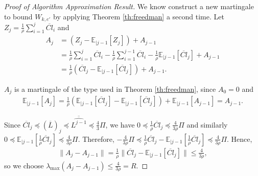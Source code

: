 \documentclass[11pt]{article}
\newcommand{\CExp}[1]{\mathbb{E}_{|#1}}
\begin{document}
\begin{proof}[Proof of Algorithm Approximation Result]
We know construct a new martingale to bound $ W_{k,e'} $ by applying Theorem \ref{th:freedman} a second time. Let $ Z_{j} = \frac{1}{\rho}\sum_{i=1}^{j}\overline{Cl}_{i} $ and 
\begin{align*}
A_{j} &= \left(Z_{j} - \CExp{j-1}\left[Z_{j}\right]\right) + A_{j-1} \\
&= \frac{1}{\rho}\sum_{i=1}^{j}\overline{Cl}_{i} - \frac{1}{\rho}\sum_{i=1}^{j-1}\overline{Cl}_{i} - \frac{1}{\rho}\CExp{j-1}\left[\overline{Cl}_{j}\right] + A_{j-1} \\
&= \frac{1}{\rho}\left(\overline{Cl}_{j} - \CExp{j-1}\left[\overline{Cl}_{j}\right]\right) + A_{j-1}.
\end{align*}

$ A_{j} $ is a martingale of the type used in Theorem \ref{th:freedman}, since $ A_{0} = 0 $ and 
\begin{align*}
\CExp{j-1}\left[A_{j}\right] =  \frac{1}{\rho}\left(\CExp{j-1}\left[\overline{Cl}_{j}\right] - \CExp{j-1}\left[\overline{Cl}_{j}\right]\right) +  \CExp{j-1}\left[A_{j-1}\right] = A_{j-1}.
\end{align*}

Since $ \overline{Cl}_{j} \preccurlyeq \left(\overline{L}\right)_{j} \preccurlyeq \overline{\widehat{L^{j-1}}} \preccurlyeq \frac{4}{3}\Pi $, 
we have $ 0 \preccurlyeq \frac{1}{\rho}\overline{Cl}_{j} \preccurlyeq \frac{4}{3\rho}\Pi $ and similarly $ 0 \preccurlyeq \CExp{j-1}\left[\frac{1}{\rho}\overline{Cl}_{j}\right] \preccurlyeq \frac{4}{3\rho}\Pi $. Therefore, $ -\frac{4}{3\rho}\Pi \preccurlyeq \frac{1}{\rho}\overline{Cl}_{j} - \CExp{j-1}\left[\frac{1}{\rho}\overline{Cl}_{j}\right] \preccurlyeq \frac{4}{3\rho}\Pi $. Hence, 
\begin{align*}
\lVert A_{j} - A_{j-1} \rVert = \frac{1}{\rho}\lVert\overline{Cl}_{j} - \CExp{j-1}\left[\overline{Cl}_{j}\right] \rVert \leq \frac{4}{3\rho},
\end{align*}
so we choose $ \lambda_{\text{max}}(A_{j} - A_{j-1}) \leq \frac{4}{3\rho} = R $.


\end{proof}
\end{document}
